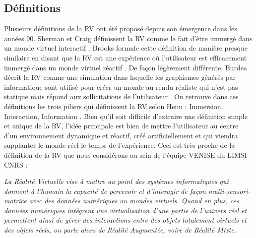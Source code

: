 \subsection{Définitions}

Plusieurs définitions de la RV ont été proposé depuis son émergence dans les années 90. Sherman et Craig définissent la RV comme le fait d'être immergé dans un monde virtuel interactif \cite{sherman2002understanding}. Brooks formule cette définition de manière presque similaire en disant que la RV est une expérience où l'utilisateur est efficacement immergé dans un monde virtuel réactif \cite{brooks1999s}. De façon légèrement différente, Burdea décrit la RV comme une simulation dans laquelle les graphismes générés par informatique sont utilisé pour créer un monde au rendu réaliste qui n'est pas statique mais répond aux sollicitations de l'utilisateur \cite{burdea2003virtual}. On retrouve dans ces définitions les trois piliers qui définissent la RV selon Heim : Immersion, Interaction, Information \cite{heim1998virtual}. Bien qu'il soit difficile d'extraire une définition simple et unique de la RV, l'idée principale est bien de mettre l'utilisateur au centre d'un environnement dynamique et réactif, créé artificiellement et qui viendra supplanter le monde réel le temps de l'expérience. Ceci est très proche de la définition de la RV que nous considérons au sein de l'équipe VENISE du LIMSI-CNRS \cite{bourdot_patrick_reconstruction_2002}:

\textit{La Réalité Virtuelle vise à mettre au point des systèmes informatiques qui donnent à l'humain la capacité de percevoir et d’interagir de façon multi-sensori-motrice avec des données numériques ou mondes virtuels. Quand en plus, ces données numériques intègrent une virtualisation d’une partie de l’univers réel et permettent ainsi de gérer des interactions entre des objets totalement virtuels et des objets réels, on parle alors de Réalité Augmentée, voire de Réalité Mixte.
}

